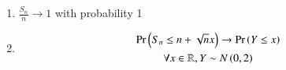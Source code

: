 \begin{enumerate}[label=\thesection.\arabic*.,ref=\thesection.\theenumi]
\begin{enumerate}
\item $\frac{S_{n}}{n} \to 1$ with probability 1
\item 
\begin{multline}
    \Pr\left({S_{n} \leq n+\sqrt{n}x}\right) \to \Pr\left({Y \leq x}\right)
    \\
    \forall x\in \mathbb{R}, Y \sim N\left(0,2\right)
\end{multline}
%
\end{enumerate}


%
\end{enumerate}